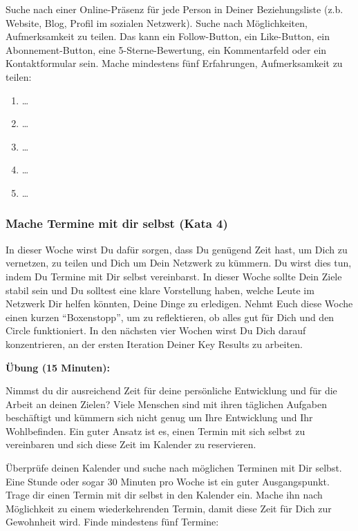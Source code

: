 \documentclass[
  ngerman,
  paper=a4,
,captions=tableheading
]{scrartcl}
\providecommand{\tightlist}{%
  \setlength{\itemsep}{0pt}\setlength{\parskip}{0pt}}
\begin{document}
Suche nach einer Online-Präsenz für jede Person in Deiner
Beziehungsliste (z.b. Website, Blog, Profil im sozialen Netzwerk). Suche
nach Möglichkeiten, Aufmerksamkeit zu teilen. Das kann ein
Follow-Button, ein Like-Button, ein Abonnement-Button, eine
5-Sterne-Bewertung, ein Kommentarfeld oder ein Kontaktformular sein.
Mache mindestens fünf Erfahrungen, Aufmerksamkeit zu teilen:

\begin{enumerate}
\def\labelenumi{\arabic{enumi}.}
\tightlist
\item
  \ldots{}
\item
  \ldots{}
\item
  \ldots{}
\item
  \ldots{}
\item
  \ldots{}
\end{enumerate}

\hypertarget{mache-termine-mit-dir-selbst-kata-4}{%
\subsubsection{Mache Termine mit dir selbst (Kata
4)}\label{mache-termine-mit-dir-selbst-kata-4}}

In dieser Woche wirst Du dafür sorgen, dass Du genügend Zeit hast, um
Dich zu vernetzen, zu teilen und Dich um Dein Netzwerk zu kümmern. Du
wirst dies tun, indem Du Termine mit Dir selbst vereinbarst. In dieser
Woche sollte Dein Ziele stabil sein und Du solltest eine klare
Vorstellung haben, welche Leute im Netzwerk Dir helfen könnten, Deine
Dinge zu erledigen. Nehmt Euch diese Woche einen kurzen ``Boxenstopp'',
um zu reflektieren, ob alles gut für Dich und den Circle funktioniert.
In den nächsten vier Wochen wirst Du Dich darauf konzentrieren, an der
ersten Iteration Deiner Key Results zu arbeiten.

\textbf{Übung (15 Minuten):}

Nimmst du dir ausreichend Zeit für deine persönliche Entwicklung und für
die Arbeit an deinen Zielen? Viele Menschen sind mit ihren täglichen
Aufgaben beschäftigt und kümmern sich nicht genug um Ihre Entwicklung
und Ihr Wohlbefinden. Ein guter Ansatz ist es, einen Termin mit sich
selbst zu vereinbaren und sich diese Zeit im Kalender zu reservieren.

Überprüfe deinen Kalender und suche nach möglichen Terminen mit Dir
selbst. Eine Stunde oder sogar 30 Minuten pro Woche ist ein guter
Ausgangspunkt. Trage dir einen Termin mit dir selbst in den Kalender
ein. Mache ihn nach Möglichkeit zu einem wiederkehrenden Termin, damit
diese Zeit für Dich zur Gewohnheit wird. Finde mindestens fünf Termine:
\end{document}
